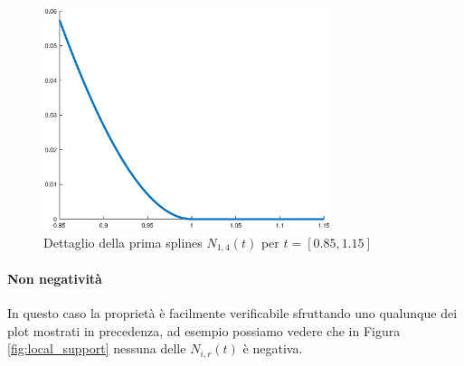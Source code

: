 \documentclass[a4paper, 10pt]{article}
\begin{document}
\begin{figure}[]
  \centering
  \includegraphics[width=0.75\textwidth]{figure/first_property.eps}
  \caption{Dettaglio della prima splines $N_{1, 4}(t)$ per $t = [0.85, 1.15]$}
  \label{fig:first_property}
\end{figure} 
\paragraph{Non negatività} In questo caso la proprietà è facilmente verificabile sfruttando uno qualunque dei plot mostrati in precedenza,
 ad esempio possiamo vedere che in Figura \ref{fig:local_support} nessuna delle $N_{i, r}(t)$ è negativa.
\end{document}
